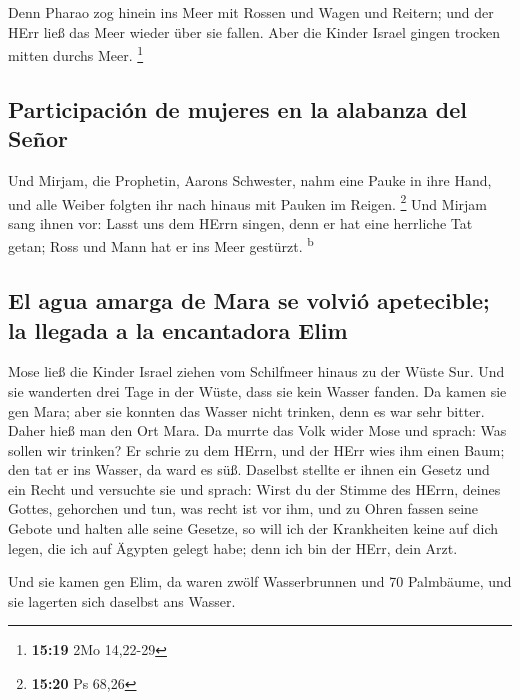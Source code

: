  Denn Pharao zog hinein ins Meer mit Rossen und Wagen und
Reitern; und der HErr ließ das Meer wieder über sie fallen. Aber die
Kinder Israel gingen trocken mitten durchs Meer. \footnote{\textbf{15:19}
  2Mo 14,22-29}

\hypertarget{participaciuxf3n-de-mujeres-en-la-alabanza-del-seuxf1or}{%
\subsection{Participación de mujeres en la alabanza del
Señor}\label{participaciuxf3n-de-mujeres-en-la-alabanza-del-seuxf1or}}

 Und Mirjam, die Prophetin, Aarons Schwester, nahm eine
Pauke in ihre Hand, und alle Weiber folgten ihr nach hinaus mit Pauken
im Reigen. \footnote{\textbf{15:20} Ps 68,26}  Und Mirjam
sang ihnen vor: Lasst uns dem HErrn singen, denn er hat eine herrliche
Tat getan; Ross und Mann hat er ins Meer gestürzt. \textsuperscript{b}

\hypertarget{el-agua-amarga-de-mara-se-volviuxf3-apetecible-la-llegada-a-la-encantadora-elim}{%
\subsection{El agua amarga de Mara se volvió apetecible; la llegada a la
encantadora
Elim}\label{el-agua-amarga-de-mara-se-volviuxf3-apetecible-la-llegada-a-la-encantadora-elim}}

 Mose ließ die Kinder Israel ziehen vom Schilfmeer hinaus
zu der Wüste Sur. Und sie wanderten drei Tage in der Wüste, dass sie
kein Wasser fanden.  Da kamen sie gen Mara; aber sie
konnten das Wasser nicht trinken, denn es war sehr bitter. Daher hieß
man den Ort Mara.  Da murrte das Volk wider Mose und
sprach: Was sollen wir trinken?  Er schrie zu dem HErrn,
und der HErr wies ihm einen Baum; den tat er ins Wasser, da ward es süß.
Daselbst stellte er ihnen ein Gesetz und ein Recht und versuchte sie
 und sprach: Wirst du der Stimme des HErrn, deines
Gottes, gehorchen und tun, was recht ist vor ihm, und zu Ohren fassen
seine Gebote und halten alle seine Gesetze, so will ich der Krankheiten
keine auf dich legen, die ich auf Ägypten gelegt habe; denn ich bin der
HErr, dein Arzt.

 Und sie kamen gen Elim, da waren zwölf Wasserbrunnen und
70 Palmbäume, und sie lagerten sich daselbst ans Wasser.

